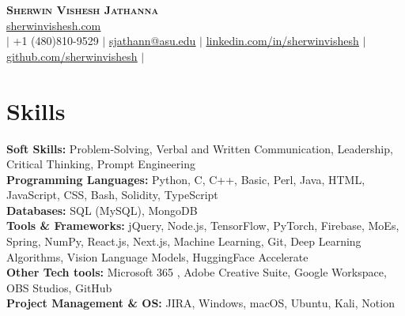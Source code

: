 \documentclass[letterpaper,11pt]{article}
\begin{document}

\begin{center}
    \textbf{\Huge \scshape Sherwin Vishesh Jathanna} \\ \vspace{1pt}
     \href{https://sherwinvishesh.com}{\underline{sherwinvishesh.com}} 
   \\ \small $|$ +1 (480)810-9529 $|$ \href{mailto:sjathann@asu.edu}{\underline{sjathann@asu.edu}} $|$ 
    \href{https://linkedin.com/in/sherwinvishesh}{\underline{linkedin.com/in/sherwinvishesh}} $|$
    \href{https://github.com/sherwinvishesh}{\underline{github.com/sherwinvishesh}} $|$
     \\ 
\end{center}




\section{Skills}
 \begin{itemize}[leftmargin=0.15in, label={}]
    \small{\item{
    \textbf{Soft Skills:}{ Problem-Solving, Verbal and Written Communication, Leadership, Critical Thinking, Prompt Engineering} \\
     \textbf{Programming Languages:}{ Python, C, C++, Basic, Perl, Java, HTML, JavaScript, CSS,  Bash, Solidity, TypeScript} \\
     \textbf{Databases:}{ SQL (MySQL), MongoDB} \\
     \textbf{Tools \& Frameworks:}{ jQuery, Node.js, TensorFlow, PyTorch, Firebase, MoEs, Spring, NumPy, React.js, Next.js,  Machine Learning, Git, Deep Learning Algorithms, Vision Language Models, HuggingFace Accelerate } \\
     \textbf{Other Tech tools:}{ Microsoft 365 , Adobe Creative Suite, Google Workspace, OBS Studios, GitHub } \\
     \textbf{Project Management \& OS: }{ JIRA, Windows, macOS, Ubuntu, Kali, Notion}
    }}
 \end{itemize}
\end{document}
